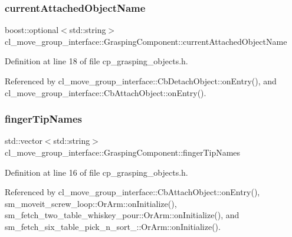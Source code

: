 \subsubsection{\texorpdfstring{current\+Attached\+Object\+Name}{currentAttachedObjectName}}
{\footnotesize\ttfamily boost\+::optional$<$std\+::string$>$ cl\+\_\+move\+\_\+group\+\_\+interface\+::\+Grasping\+Component\+::current\+Attached\+Object\+Name}



Definition at line 18 of file cp\+\_\+grasping\+\_\+objects.\+h.



Referenced by cl\+\_\+move\+\_\+group\+\_\+interface\+::\+Cb\+Detach\+Object\+::on\+Entry(), and cl\+\_\+move\+\_\+group\+\_\+interface\+::\+Cb\+Attach\+Object\+::on\+Entry().

\mbox{\label{classcl__move__group__interface_1_1GraspingComponent_afc08a0abc3220a377d0bbf798383a42a}} 
\subsubsection{\texorpdfstring{finger\+Tip\+Names}{fingerTipNames}}
{\footnotesize\ttfamily std\+::vector$<$std\+::string$>$ cl\+\_\+move\+\_\+group\+\_\+interface\+::\+Grasping\+Component\+::finger\+Tip\+Names}



Definition at line 16 of file cp\+\_\+grasping\+\_\+objects.\+h.



Referenced by cl\+\_\+move\+\_\+group\+\_\+interface\+::\+Cb\+Attach\+Object\+::on\+Entry(), sm\+\_\+moveit\+\_\+screw\+\_\+loop\+::\+Or\+Arm\+::on\+Initialize(), sm\+\_\+fetch\+\_\+two\+\_\+table\+\_\+whiskey\+\_\+pour\+::\+Or\+Arm\+::on\+Initialize(), and sm\+\_\+fetch\+\_\+six\+\_\+table\+\_\+pick\+\_\+n\+\_\+sort\+\_\+::\+Or\+Arm\+::on\+Initialize().

\mbox{\label{classcl__move__group__interface_1_1GraspingComponent_a5e0364a3b76738fb263b11c4e1ef56cc}} 
